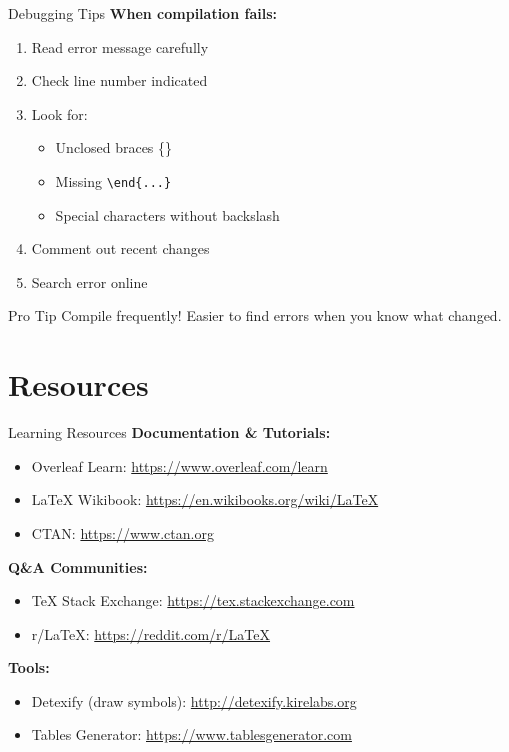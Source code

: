 \documentclass[aspectratio=169]{beamer}
\begin{document}
	\begin{frame}{Debugging Tips}
		\textbf{When compilation fails:}
		
		\begin{enumerate}
			\item Read error message carefully
			\item Check line number indicated
			\item Look for:
			\begin{itemize}
				\item Unclosed braces \{\}
				\item Missing \texttt{\textbackslash end\{...\}}
				\item Special characters without backslash
			\end{itemize}
			\item Comment out recent changes
			\item Search error online
		\end{enumerate}
		
		\vspace{1em}
		
		\begin{block}{Pro Tip}
			Compile frequently! Easier to find errors when you know what changed.
		\end{block}
	\end{frame}
	
	\section{Resources}
	
	\begin{frame}{Learning Resources}
		\textbf{Documentation \& Tutorials:}
		\begin{itemize}
			\item Overleaf Learn: \url{https://www.overleaf.com/learn}
			\item LaTeX Wikibook: \url{https://en.wikibooks.org/wiki/LaTeX}
			\item CTAN: \url{https://www.ctan.org}
		\end{itemize}
		
		\vspace{0.5em}
		
		\textbf{Q\&A Communities:}
		\begin{itemize}
			\item TeX Stack Exchange: \url{https://tex.stackexchange.com}
			\item r/LaTeX: \url{https://reddit.com/r/LaTeX}
		\end{itemize}
		
		\vspace{0.5em}
		
		\textbf{Tools:}
		\begin{itemize}
			\item Detexify (draw symbols): \url{http://detexify.kirelabs.org}
			\item Tables Generator: \url{https://www.tablesgenerator.com}
		\end{itemize}
	\end{frame}
	
\end{document}
